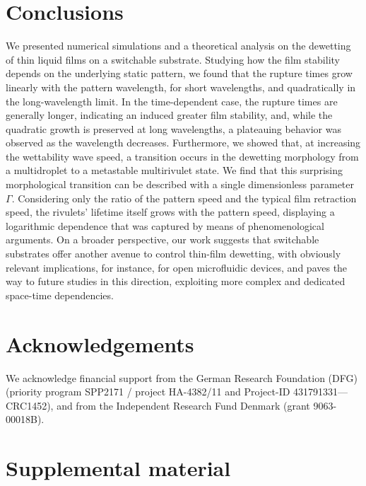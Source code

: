 \section{Conclusions}
We presented numerical simulations and a theoretical analysis on the dewetting of thin liquid films on a switchable substrate.
Studying how the film stability depends on the underlying static pattern, we found that the rupture times grow linearly with the pattern wavelength, for short wavelengths, and quadratically in the long-wavelength limit. 
In the time-dependent case, the rupture times are generally longer, indicating an induced greater film stability, and, while the quadratic growth is preserved at long wavelengths, a plateauing behavior was observed as the wavelength decreases. 
Furthermore, we showed that, at increasing the wettability wave speed, a transition occurs in the dewetting morphology from a multidroplet to a metastable multirivulet state. 
We find that this surprising morphological transition can be described with a single dimensionless parameter $\Gamma$.
Considering only the ratio of the pattern speed and the typical film retraction speed, the rivulets' lifetime itself grows with the pattern speed, displaying a logarithmic dependence that was captured by means of phenomenological arguments.
On a broader perspective, our work suggests that switchable substrates offer another avenue to control thin-film dewetting, with obviously relevant implications, for instance, for open microfluidic devices, and paves the way to future studies in this direction, exploiting more complex and dedicated space-time dependencies.

\section{Acknowledgements} We acknowledge financial support from the German Research Foundation (DFG) (priority program SPP2171 / project HA-4382/11 and Project-ID 431791331—CRC1452), and from the Independent Research Fund Denmark (grant 9063-00018B).
\newpage

\section{Supplemental material}\label{suppmat}
